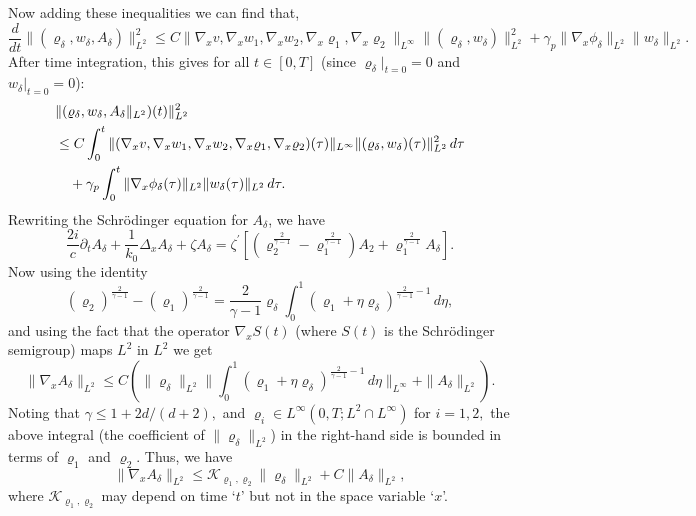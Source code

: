 \documentclass[11pt,twoside]{amsart}
\newcommand{\vr}{\varrho}
\begin{document}
Now adding these inequalities we can find that, 
$$
\frac d{dt}\|(\vr_\delta, w_\delta,A_\delta)\|_{L^2}^2\leq C
\|\nabla_x v,\nabla_x w_1,\nabla_x w_2,\nabla_x\varrho_1,\nabla_x\varrho_2\|_{L^\infty}
\|(\vr_\delta,w_\delta)\|_{L^2}^2+\gamma_p\|\nabla_x \phi_\delta\|_{L^2}\|w_\delta\|_{L^2}.
$$
After time integration, this gives  for all $t\in[0,T]$ (since $\varrho_\delta |_{t=0}=0$ and $w_\delta |_{t=0}=0$): 
\begin{align}\label{gro1}
&\|(\vr_\delta,w_\delta,A_\delta\|_{L^2})(t)\|^2_{L^2} \\ 
& \leq C\int_0^t\|(\nabla_x v,\nabla_x w_1,\nabla_x w_2,\nabla_x\varrho_1,\nabla_x\varrho_2)(\tau)\|_{L^\infty}
\|(\vr_\delta, w_\delta)(\tau)\|^2_{L^2}\,d\tau \notag  \\ 
& \quad +\gamma_p\int_0^t \|\nabla_x\phi_\delta(\tau)\|_{L^2} \|w_\delta(\tau)\|_{L^2} \, d \tau.
\notag 
\end{align} 
%
Rewriting the Schr\"{o}dinger equation for $A_\delta$, we have
$$
\frac{2i}{c}\partial_t A_\delta+\frac{1}{k_0}\Delta_x A_\delta+\zeta A_\delta =
\zeta^\prime \left[\left(\varrho_2^{\frac{2}{\gamma-1}} - \varrho_1^{\frac{2}{\gamma-1}}\right)A_2
+\varrho_1^{\frac{2}{\gamma-1}}A_\delta\right] .
$$
Now using the
 identity $$(\varrho_2)^{\frac2{\gamma-1}}-(\varrho_1)^{\frac2{\gamma-1}}=\frac2{\gamma-1}\vr_\delta\int_0^1 (\varrho_1+\eta\vr_\delta)^{\frac2{\gamma-1}-1}\,d\eta, $$
 and using the fact that the operator $\nabla_x  S(t)$ (where $S(t)$ is the Schr\"{o}dinger semigroup) maps $L^2$ in $L^2$
we get 
$$\|\nabla_xA _\delta\|_{L^2}\leq C\left(\|\vr_\delta\|_{L^2}\biggl\|\int_0^1 (\varrho_1+\eta\vr_\delta)^{\frac2{\gamma-1}-1}\,d\eta\biggr\|_{L^\infty}+\|A_\delta\|_{L^2}\right).$$
Noting that $\gamma\leq 1+2d/(d+2),$ and $\varrho_i\in L^\infty(0,T;L^2\cap L^\infty)$ for $i=1,2,$ the above integral (the coefficient of $\|\varrho_\delta\|_{L^2}$) in the right-hand side is  bounded  in terms of $\varrho_1$ and $\varrho_2$. Thus, we have 
\begin{equation}\label{aux-gro2}
\|\nabla_x A_\delta\|_{L^2} \leq \mathcal K_{\varrho_1, \varrho_2} \|\varrho_\delta\|_{L^2} + C \|A_\delta\|_{L^2} ,
\end{equation}
where $\mathcal K_{\varrho_1,\varrho_2}$ may depend on time `$t$' but not in the space variable `$x$'. 
\end{document}
